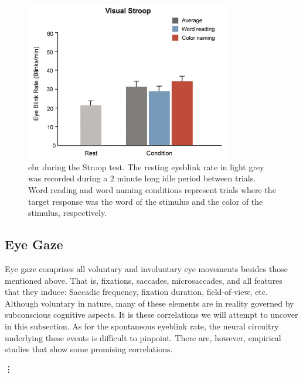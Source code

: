\begin{figure}[h]
    \centering
    \includegraphics[width=0.8\textwidth]{figures/bt_oh2012B.png}
    \caption{\acrfull{ebr} during the Stroop test. The resting eyeblink rate in light grey was recorded during a 2 minute long idle period between trials. Word reading and word naming conditions represent trials where the target response was the word of the stimulus and the color of the stimulus, respectively.}
    \label{fig:bt/oh2012B}
\end{figure}

\subsection{Eye Gaze} \label{sec:bt/cognitive_impacts/gaze}

Eye gaze comprises all voluntary and involuntary eye movements besides those mentioned above. That is, fixations, saccades, microsaccades, and all features that they induce: Saccadic frequency, fixation duration, field-of-view, etc. Although voluntary in nature, many of these elements are in reality governed by subconscious cognitive aspects. It is these correlations we will attempt to uncover in this subsection. As for the spontaneous eyeblink rate, the neural circuitry underlying these events is difficult to pinpoint. There are, however, empirical studies that show some promising correlations.



\vdots

\FloatBarrier